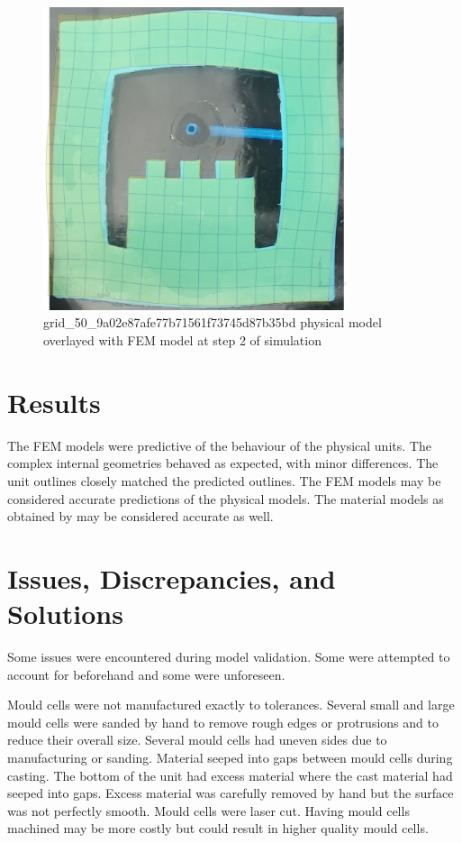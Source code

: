 \begin{figure}[H]
	\centering
	\includegraphics[width=0.8\textwidth]{unit3defover.png}
	\caption[Physical model of unit 3 overlayed with FEM model]{grid\_50\_9a02e87afe77b71561f73745d87b35bd physical model overlayed with FEM model at step 2 of simulation}
	\label{fig:unit3over}
\end{figure}

\section{Results}

The FEM models were predictive of the behaviour of the physical units. The complex internal geometries behaved as expected, with minor differences. The unit outlines closely matched the predicted outlines. The FEM models may be considered accurate predictions of the physical models. The material models as obtained by \cite{Ellis2020} may be considered accurate as well.

\section{Issues, Discrepancies, and Solutions}

Some issues were encountered during model validation. Some were attempted to account for beforehand and some were unforeseen.

Mould cells were not manufactured exactly to tolerances. Several small and large mould cells were sanded by hand to remove rough edges or protrusions and to reduce their overall size. Several mould cells had uneven sides due to manufacturing or sanding. Material seeped into gaps between mould cells during casting. The bottom of the unit had excess material where the cast material had seeped into gaps. Excess material was carefully removed by hand but the surface was not perfectly smooth. Mould cells were laser cut. Having mould cells machined may be more costly but could result in higher quality mould cells.


